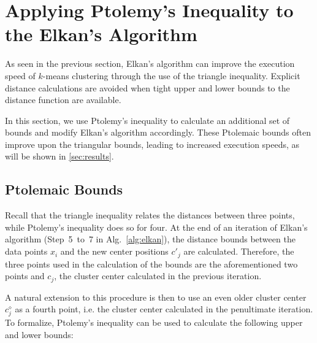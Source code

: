 \newcommand{\prev}{\diamond}

\section{Applying Ptolemy's Inequality to the Elkan's Algorithm}
\label{sec:contrib}

As seen in the previous section,
Elkan's algorithm can improve the execution speed of $k$-means clustering through the use of the triangle inequality.
Explicit distance calculations are avoided when tight upper and lower bounds to the distance function are available.

In this section, we use Ptolemy's inequality to calculate an additional set of bounds and modify Elkan's algorithm accordingly.
These Ptolemaic bounds often improve upon the triangular bounds, leading to increased execution speeds, as will be shown in \autoref{sec:results}.


\subsection{Ptolemaic Bounds}
Recall that the triangle inequality relates the distances between three points,
while Ptolemy's inequality does so for four.
At the end of an iteration of Elkan's algorithm (Step~5~to~7 in Alg.~\ref{alg:elkan}),
the distance bounds between the data points $x_i$ and the new center positions $c'_j$ are calculated.
Therefore, the three points used in the calculation of the bounds are the aforementioned two points and $c_j$, the cluster center calculated in the previous iteration.

A natural extension to this procedure is then to use an even older cluster center $c^\prev_j$ as a fourth point,
i.e. the cluster center calculated in the penultimate iteration.
To formalize, Ptolemy's inequality can be used to calculate the following upper and lower bounds:

